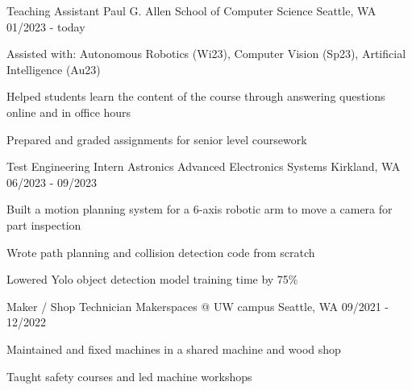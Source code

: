
\begin{cventries}
  \cventry
    {Teaching Assistant} %
    {Paul G. Allen School of Computer Science} %
    {Seattle, WA} %
    {01/2023 - today} %
    {
      \begin{cvitems}
        \item {Assisted with: Autonomous Robotics (Wi23), Computer Vision (Sp23), Artificial Intelligence (Au23)}
        \item {Helped students learn the content of the course through answering questions online and in office hours}
        \item {Prepared and graded assignments for senior level coursework}
      \end{cvitems}
    }
    
  \cventry
    {Test Engineering Intern} %
    {Astronics Advanced Electronics Systems} %
    {Kirkland, WA} %
    {06/2023 - 09/2023} %
    {
      \begin{cvitems}
        \item {Built a motion planning system for a 6-axis robotic arm to move a camera for part inspection}
        \item {Wrote path planning and collision detection code from scratch}
        \item {Lowered Yolo object detection model training time by 75\%}
      \end{cvitems}
    }
    
  \cventry
    {Maker / Shop Technician} %
    {Makerspaces @ UW campus} %
    {Seattle, WA} %
    {09/2021 - 12/2022} %
    {
      \begin{cvitems}
        \item {Maintained and fixed machines in a shared machine and wood shop}
        \item {Taught safety courses and led machine workshops}
      \end{cvitems}
    }
    


\end{cventries}
